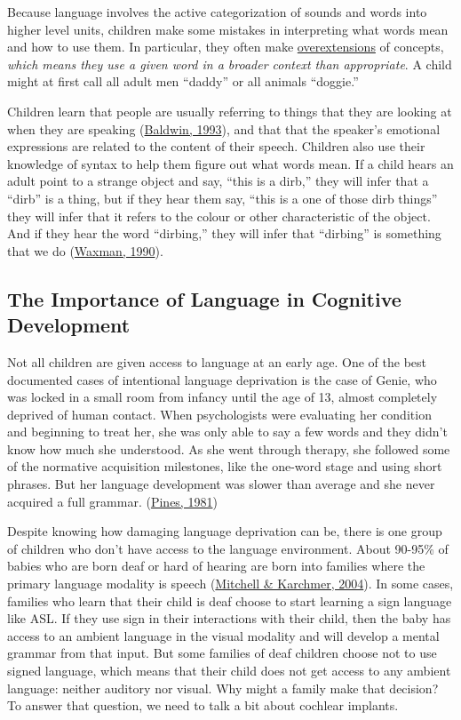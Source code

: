 \documentclass[
]{krantz}
\begin{document}
Because language involves the active categorization of sounds and words into higher level units, children make some mistakes in interpreting what words mean and how to use them. In particular, they often make \protect\hyperlink{overextensions}{overextensions} of concepts, \emph{which means they use a given word in a broader context than appropriate}. A child might at first call all adult men ``daddy'' or all animals ``doggie.''

Children learn that people are usually referring to things that they are looking at when they are speaking (\protect\hyperlink{ref-Baldwin1993}{Baldwin, 1993}), and that that the speaker's emotional expressions are related to the content of their speech. Children also use their knowledge of syntax to help them figure out what words mean. If a child hears an adult point to a strange object and say, ``this is a dirb,'' they will infer that a ``dirb'' is a thing, but if they hear them say, ``this is a one of those dirb things'' they will infer that it refers to the colour or other characteristic of the object. And if they hear the word ``dirbing,'' they will infer that ``dirbing'' is something that we do (\protect\hyperlink{ref-Waxman1990}{Waxman, 1990}).

\hypertarget{the-importance-of-language-in-cognitive-development}{%
\subsection*{The Importance of Language in Cognitive Development}\label{the-importance-of-language-in-cognitive-development}}


Not all children are given access to language at an early age. One of the best documented cases of intentional language deprivation is the case of Genie, who was locked in a small room from infancy until the age of 13, almost completely deprived of human contact. When psychologists were evaluating her condition and beginning to treat her, she was only able to say a few words and they didn't know how much she understood. As she went through therapy, she followed some of the normative acquisition milestones, like the one-word stage and using short phrases. But her language development was slower than average and she never acquired a full grammar. (\protect\hyperlink{ref-pines1981}{Pines, 1981})

Despite knowing how damaging language deprivation can be, there is one group of children who don't have access to the language environment. About 90-95\% of babies who are born deaf or hard of hearing are born into families where the primary language modality is speech (\protect\hyperlink{ref-mitchell-karchmer2004}{Mitchell \& Karchmer, 2004}). In some cases, families who learn that their child is deaf choose to start learning a sign language like ASL. If they use sign in their interactions with their child, then the baby has access to an ambient language in the visual modality and will develop a mental grammar from that input. But some families of deaf children choose not to use signed language, which means that their child does not get access to any ambient language: neither auditory nor visual. Why might a family make that decision? To answer that question, we need to talk a bit about cochlear implants.
\end{document}
